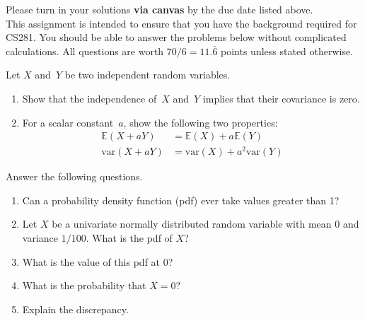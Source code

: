 \documentclass{harvardml}
\newcommand{\E}{\mathbb{E}}
\newcommand{\var}{\text{var}}
\begin{document}
\noindent Please turn in your solutions \textbf{via canvas} by the due date listed above.
\\

\noindent This assignment is intended to ensure that you have the background required for CS281. You should be able to answer the problems below without complicated calculations. All questions are worth $70/6 = 11.\bar{6}$ points unless stated otherwise.

\begin{problem}
Let $X$ and~$Y$ be two independent random variables.

\begin{enumerate}[label=(\alph*)]
\item Show that the independence of~$X$ and~$Y$ implies that their
covariance is zero.

\item For a scalar constant~$a$, show the following two properties:
\begin{align*}
  \E(X + aY) &= \E(X) + a\E(Y)\\
  \var(X + aY) &= \var(X) + a^2\var(Y)
\end{align*}
\end{enumerate}
\end{problem}


\begin{problem}[Densities]
Answer the following questions.
\begin{enumerate}[label=(\alph*)]
  \item Can a probability density function (pdf) ever take values greater than 1?
  \item Let $X$ be a univariate normally distributed random variable with mean 0 and variance $1/100$. What is the pdf of $X$?
  \item What is the value of this pdf at 0?
  \item What is the probability that $X = 0$?
  \item Explain the discrepancy.
\end{enumerate}
\end{problem}


\end{document}
